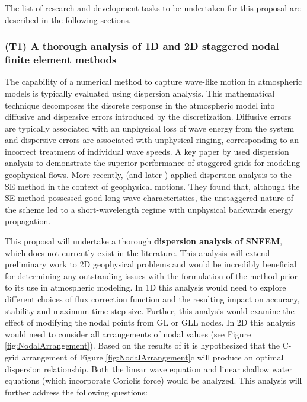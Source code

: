 \documentclass[11pt]{article}
\begin{document}
The list of research and development tasks to be undertaken for this proposal are described in the following sections.

\subsubsection{(T1) A thorough analysis of 1D and 2D staggered nodal finite element methods} \label{sec:AnalysisSNFEM}


The capability of a numerical method to capture wave-like motion in atmospheric models is typically evaluated using dispersion analysis.  This mathematical technique decomposes the discrete response in the atmospheric model into diffusive and dispersive errors introduced by the discretization.  Diffusive errors are typically associated with an unphysical loss of wave energy from the system and dispersive errors are associated with unphysical ringing, corresponding to an incorrect treatment of individual wave speeds.  A key paper by \cite{randall1994geostrophic} used dispersion analysis to demonstrate the superior performance of staggered grids for modeling geophysical flows.  More recently, \cite{MAHAW2009SIAMJNA} (and later \cite{melvin2012dispersion}) applied dispersion analysis to the SE method in the context of geophysical motions.  They found that, although the SE method possessed good long-wave characteristics, the unstaggered nature of the scheme led to a short-wavelength regime with unphysical backwards energy propagation.

This proposal will undertake a thorough \textbf{dispersion analysis of SNFEM}, which does not currently exist in the literature.  This analysis will extend preliminary work to 2D geophysical problems and would be incredibly beneficial for determining any outstanding issues with the formulation of the method prior to its use in atmospheric modeling.  In 1D this analysis would need to explore different choices of flux correction function \cite{huynh2007flux} and the resulting impact on accuracy, stability and maximum time step size.  Further, this analysis would examine the effect of modifying the nodal points from GL or GLL nodes.  In 2D this analysis would need to consider all arrangements of nodal values (see Figure \ref{fig:NodalArrangement}).  Based on the results of \cite{randall1994geostrophic} it is hypothesized that the C-grid arrangement of Figure \ref{fig:NodalArrangement}c will produce an optimal dispersion relationship.  Both the linear wave equation and linear shallow water equations (which incorporate Coriolis force) would be analyzed.  This analysis will further address the following questions:
\end{document}

